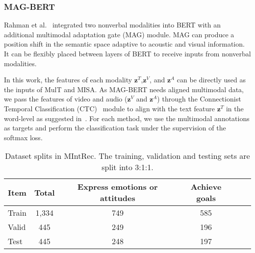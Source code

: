 \documentclass[sigconf,camera-ready]{acmart}
\begin{document}
\subsubsection{MAG-BERT}
Rahman et al.~\cite{BERT_MAG} integrated two nonverbal modalities into BERT with an additional multimodal adaptation gate (MAG) module. MAG can produce a position shift in the semantic space adaptive to acoustic and visual information. It can be flexibly placed between layers of BERT to receive inputs from nonverbal modalities. 

In this work, the features of each modality $\mathbf{z}^{T}$,$ \mathbf{z}^{V}$, and $\mathbf{z}^{A}$ can be directly used as the inputs of MulT and MISA. As MAG-BERT needs aligned multimodal data, we pass the features of video and audio ($ \mathbf{z}^{V}$ and  $\mathbf{z}^{A}$) through the Connectionist Temporal
Classification (CTC)~\cite{graves2006connectionist} module to align with the text feature $\mathbf{z}^{T}$ in the word-level as suggested in~\cite{tsai2019multimodal}.  For each method, we use the multimodal annotations as targets and perform the classification task under the supervision of the softmax loss.
\begin{table}[t!]\small
	\caption{\label{datasplit} Dataset splits in MIntRec. The training, validation and testing sets are split into 3:1:1. 
	}
	\begin{tabular}{l|c|cccc} 
		\midrule
		Item  & Total  & Express emotions or attitudes   &  Achieve goals \\
		\midrule
		Train  & 1,334   & 749  & 585    \\
		Valid  & 445  & 249 & 196  \\
		Test   & 445   & 248  & 197 \\
		\midrule
	\end{tabular}
\end{table}
\end{document}
